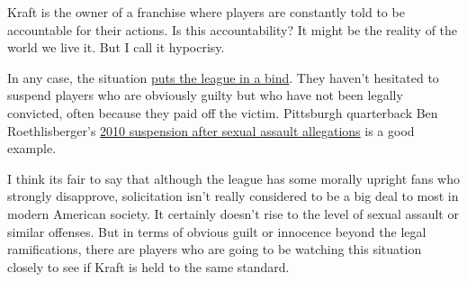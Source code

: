 \documentclass[11pt]{article}
\begin{document}
\begin{itemize}
Kraft is the owner of a franchise where players are constantly told to be accountable for their actions.  Is this accountability?  It might be the reality of the world we live it.  But I call it hypocrisy.

In any case, the situation \href{https://profootballtalk.nbcsports.com/2019/05/16/if-robert-kraft-is-exonerated-what-happens-next/}{puts the league in a bind}.  They  haven't hesitated to suspend players who are obviously guilty but who have not been legally convicted, often because they paid off the victim.  Pittsburgh quarterback Ben Roethlisberger's \href{https://en.wikipedia.org/wiki/Ben_Roethlisberger#Sexual_assault_allegations}{2010 suspension after sexual assault allegations} is a good example.

I think its fair to say that although the league has some morally upright fans who strongly disapprove, solicitation isn't really considered to be a big deal to most in modern American society.  It certainly doesn't rise to the level of sexual assault or similar offenses.  But in terms of obvious guilt or innocence beyond the legal ramifications, there are players who are going to be watching this situation closely to see if Kraft is held to the same standard.
\end{itemize}
\end{document}
